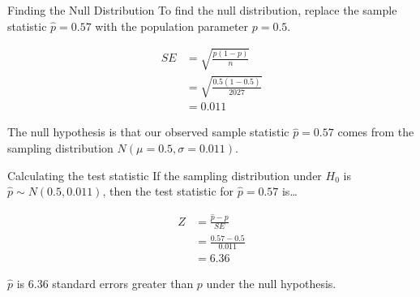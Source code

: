 \documentclass[
  ignorenonframetext,
]{beamer}
\begin{document}
\begin{frame}{Finding the Null Distribution}
\label{finding-the-null-distribution}
To find the null distribution, replace the sample statistic
\(\hat{p}=0.57\) with the population parameter \(p=0.5\).

\[
\begin{aligned}
SE&=\sqrt{\frac{p(1-p)}{n}} \\
&= \sqrt{\frac{0.5(1-0.5)}{2027}} \\
&=0.011
\end{aligned}
\]

\pause

The null hypothesis is that our observed sample statistic
\(\hat{p}=0.57\) comes from the sampling distribution
\(N(\mu=0.5, \sigma=0.011)\).
\end{frame}

\begin{frame}{Calculating the test statistic}
\label{calculating-the-test-statistic}
If the sampling distribution under \(H_0\) is
\(\hat{p}\sim N(0.5, 0.011)\), then the test statistic for
\(\hat{p}=0.57\) is\ldots{}

\[
\begin{aligned}
Z &= \frac{\hat{p} - p}{SE} \\
&= \frac{0.57-0.5}{0.011} \\
&=6.36
\end{aligned}
\]

\pause

\(\hat{p}\) is 6.36 standard errors greater than \(p\) under the null
hypothesis.
\end{frame}
\end{document}
